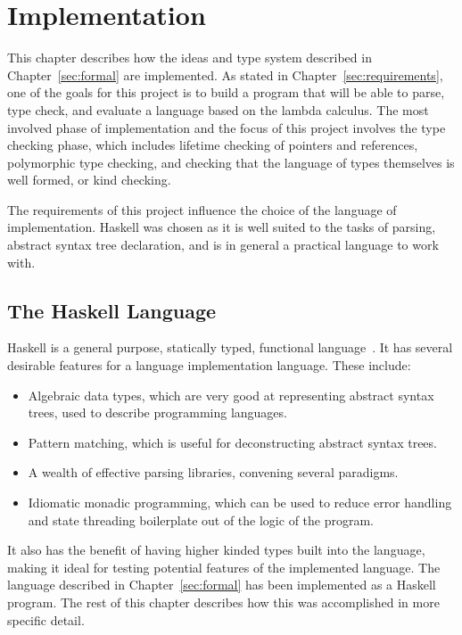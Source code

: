 \chapter{Implementation}\label{sec:impl}
This chapter describes how the ideas and type system described in
Chapter~\ref{sec:formal} are implemented. As stated in
Chapter~\ref{sec:requirements}, one of the goals for this project is to build a
program that will be able to parse, type check, and evaluate a language based
on the lambda calculus. The most involved phase of implementation and the focus
of this project involves the type checking phase, which includes lifetime
checking of pointers and references, polymorphic type checking, and checking
that the language of types themselves is well formed, or kind checking.

The requirements of this project influence the choice of the language of
implementation. Haskell was chosen as it is well suited to the tasks of
parsing, abstract syntax tree declaration, and is in general a practical
language to work with.

\section{The Haskell Language}
Haskell is a general purpose, statically typed, functional
language~\cite{haskell}. It has several desirable features for a language
implementation language. These include:

\begin{itemize}
    \item Algebraic data types, which are very good at representing abstract syntax
    trees, used to describe programming languages.
    \item Pattern matching, which is useful for deconstructing abstract syntax trees.
    \item A wealth of effective parsing libraries, convening several paradigms.
    \item Idiomatic monadic programming, which can be used to reduce error handling
    and state threading boilerplate out of the logic of the program.
\end{itemize}

It also has the benefit of having higher kinded types built into the language,
making it ideal for testing potential features of the implemented language.
The language described in Chapter~\ref{sec:formal} has been implemented as a
Haskell program. The rest of this chapter describes how this was accomplished
in more specific detail.

